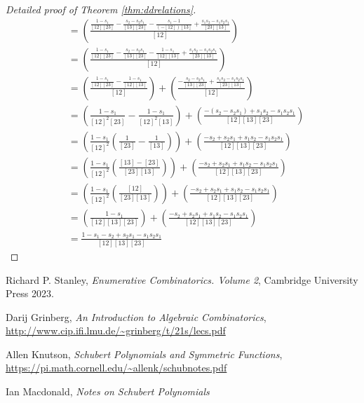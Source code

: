 \documentclass{article}
\begin{document}
\begin{proof}[Detailed proof of Theorem \ref{thm:ddrelations}]
\begin{align*}
        &= \left(\frac{\frac{1 - s_1}{[12][23]} - \frac{s_2 - s_2s_1}{[13][23]} - \frac{s_1 - 1}{(-[12])[13]} + \frac{s_1s_2 - s_1s_2s_1}{[23][13]}}{[12]}\right) \\
        &= \left(\frac{\frac{1 - s_1}{[12][23]} - \frac{s_2 - s_2s_1}{[13][23]} - \frac{1 - s_1}{[12][13]} + \frac{s_1s_2 - s_1s_2s_1}{[23][13]}}{[12]}\right) \\
        &= \left(\frac{\frac{1-s_1}{[12][23]} - \frac{1-s_1}{[12][13]}}{[12]}\right) +\left(\frac{-\frac{s_2 - s_2s_1}{[13][23]} + \frac{s_1s_2 - s_1s_2s_1}{[23][13]}}{[12]}\right) \\
        &= \left(\frac{1-s_1}{[12]^2[23]} - \frac{1-s_1}{[12]^2[13]}\right) + \left(\frac{-(s_2 - s_2s_1) + s_1s_2 - s_1s_2s_1}{[12][13][23]}\right)\\
        &= \left(\frac{1-s_1}{[12]^2}\left(\frac{1}{[23]}-\frac{1}{[13]}\right)\right) + \left(\frac{-s_2 + s_2s_1 + s_1s_2 - s_1s_2s_1}{[12][13][23]}\right)\\
        &= \left(\frac{1-s_1}{[12]^2}\left(\frac{[13]-[23]}{[23][13]}\right)\right) + \left(\frac{-s_2 + s_2s_1 + s_1s_2 - s_1s_2s_1}{[12][13][23]}\right)\\
        &= \left(\frac{1-s_1}{[12]^2}\left(\frac{[12]}{[23][13]}\right)\right) + \left(\frac{-s_2 + s_2s_1 + s_1s_2 - s_1s_2s_1}{[12][13][23]}\right)\\
        &= \left(\frac{1-s_1}{[12][13][23]}\right) + \left(\frac{-s_2 + s_2s_1 + s_1s_2 - s_1s_2s_1}{[12][13][23]}\right)\\
        &= \frac{1-s_1-s_2+s_2s_1-s_1s_2s_1}{[12][13][23]}    
    \end{align*}
\end{proof}



\begin{thebibliography}{999999999}
    \footnotesize \raggedright
    Richard P. Stanley, \textit{Enumerative Combinatorics. Volume 2}, Cambridge University Press 2023.

    Darij Grinberg, \textit{An Introduction to Algebraic Combinatorics}, \url{http://www.cip.ifi.lmu.de/~grinberg/t/21s/lecs.pdf}

    Allen Knutson, \textit{Schubert Polynomials and Symmetric Functions}, \url{https://pi.math.cornell.edu/~allenk/schubnotes.pdf}

    Ian Macdonald, \textit{Notes on Schubert Polynomials}
\end{thebibliography}
\end{document}
